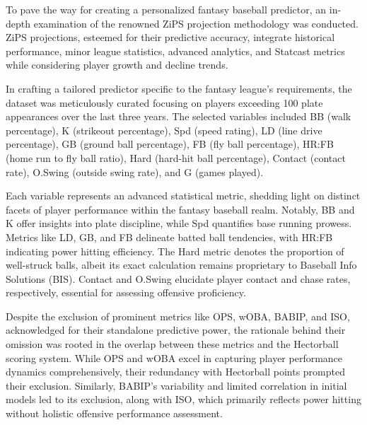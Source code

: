 \documentclass[12pt, english]{article}
\begin{document}
To pave the way for creating a personalized fantasy baseball predictor, an in-depth examination of the renowned ZiPS projection methodology was conducted. ZiPS projections, esteemed for their predictive accuracy, integrate historical performance, minor league statistics, advanced analytics, and Statcast metrics while considering player growth and decline trends.


In crafting a tailored predictor specific to the fantasy league's requirements, the dataset was meticulously curated focusing on players exceeding 100 plate appearances over the last three years. The selected variables included BB (walk percentage), K (strikeout percentage), Spd (speed rating), LD (line drive percentage), GB (ground ball percentage), FB (fly ball percentage), HR:FB (home run to fly ball ratio), Hard (hard-hit ball percentage), Contact (contact rate), O.Swing (outside swing rate), and G (games played).


Each variable represents an advanced statistical metric, shedding light on distinct facets of player performance within the fantasy baseball realm. Notably, BB and K offer insights into plate discipline, while Spd quantifies base running prowess. Metrics like LD, GB, and FB delineate batted ball tendencies, with HR:FB indicating power hitting efficiency. The Hard metric denotes the proportion of well-struck balls, albeit its exact calculation remains proprietary to Baseball Info Solutions (BIS). Contact and O.Swing elucidate player contact and chase rates, respectively, essential for assessing offensive proficiency.


Despite the exclusion of prominent metrics like OPS, wOBA, BABIP, and ISO, acknowledged for their standalone predictive power, the rationale behind their omission was rooted in the overlap between these metrics and the Hectorball scoring system. While OPS and wOBA excel in capturing player performance dynamics comprehensively, their redundancy with Hectorball points prompted their exclusion. Similarly, BABIP's variability and limited correlation in initial models led to its exclusion, along with ISO, which primarily reflects power hitting without holistic offensive performance assessment.
\end{document}
